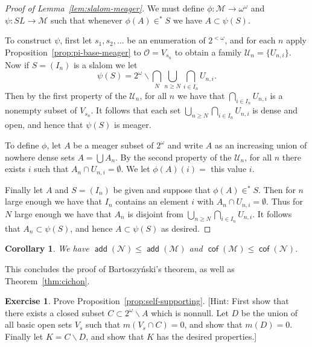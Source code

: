 \documentclass[11pt,oneside]{amsbook}
\newcommand{\Null}{\mathcal N}
\newcommand{\Meager}{\mathcal M}
\DeclareMathOperator{\add}{\mathsf{add}}
\DeclareMathOperator{\cof}{\mathsf{cof}}
\theoremstyle{definition}
\newtheorem{exerc}{Exercise}[section]
\theoremstyle{plain}
\newtheorem{cor}[thm]{Corollary}
\theoremstyle{definition}
\theoremstyle{remark}
\begin{document}
\begin{proof}[Proof of Lemma~\ref{lem:slalom-meager}]
  We must define $\phi\colon\Meager\to\omega^\omega$ and $\psi\colon SL\to\Meager$ such that whenever $\phi(A)\in^*S$ we have $A\subset\psi(S)$.

  To construct $\psi$, first let $s_1,s_2,\ldots$ be an enumeration of $2^{<\omega}$, and for each $n$ apply Proposition~\ref{prop:pi-base-meager} to $\mathcal O=V_{s_n}$ to obtain a family $\mathcal U_n=\{U_{n,i}\}$. Now if $S=(I_n)$ is a slalom we let
  \[\psi(S)=2^\omega\smallsetminus\bigcap_N\bigcup_{n\geq N}\bigcap_{i\in I_n}U_{n,i}\text{.}
  \]
  Then by the first property of the $\mathcal U_n$, for all $n$ we have that $\bigcap_{i\in I_n}U_{n,i}$ is a nonempty subset of $V_{s_n}$. It follows that each set $\bigcup_{n\geq N}\bigcap_{i\in I_n}U_{n,i}$ is dense and open, and hence that $\psi(S)$ is meager.

  To define $\phi$, let $A$ be a meager subset of $2^\omega$ and write $A$ as an increasing union of nowhere dense sets $A=\bigcup A_n$. By the second property of the $\mathcal U_n$, for all $n$ there exists $i$ such that $A_n\cap U_{n,i}=\emptyset$. We let $\phi(A)(i)=$ this value $i$.

  Finally let $A$ and $S=(I_n)$ be given and suppose that $\phi(A)\in^*S$. Then for $n$ large enough we have that $I_n$ contains an element $i$ with $A_n\cap U_{n,i}=\emptyset$. Thus for $N$ large enough we have that $A_n$ is disjoint from $\bigcup_{n\geq N}\bigcap_{i\in I_n}U_{n,i}$. It follows that $A_n\subset\psi(S)$, and hence $A\subset\psi(S)$ as desired.
\end{proof}

\begin{cor}
  We have $\add(\Null)\leq\add(\Meager)$ and $\cof(\Meager)\leq\cof(\Null)$.
\end{cor}

This concludes the proof of Bartoszy\'nski's theorem, as well as Theorem~\ref{thm:cichon}.

\begin{exerc}
  \label{exerc:self-supporting}
  Prove Proposition~\ref{prop:self-supporting}. [Hint: First show that there exists a closed subset $C\subset2^\omega\smallsetminus A$ which is nonnull. Let $D$ be the union of all basic open sets $V_s$ such that $m(V_s\cap C)=0$, and show that $m(D)=0$. Finally let $K=C\smallsetminus D$, and show that $K$ has the desired properties.]
\end{exerc}
\end{document}
